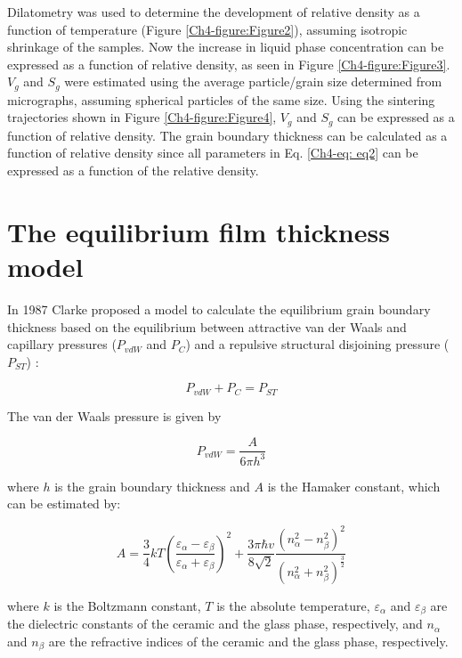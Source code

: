 Dilatometry was used to determine the development of relative density as a function of temperature (Figure \ref{Ch4-figure:Figure2}), assuming isotropic shrinkage of the samples. Now the increase in liquid phase concentration can be expressed as a function of relative density, as seen in Figure \ref{Ch4-figure:Figure3}. $V_{g}$ and $S_{g}$ were estimated using the average particle/grain size determined from micrographs, assuming spherical particles of the same size. Using the sintering trajectories shown in Figure \ref{Ch4-figure:Figure4}, $V_{g}$ and $S_{g}$ can be expressed as a function of relative density. The grain boundary thickness can be calculated as a function of relative density since all parameters in Eq. \ref{Ch4-eq: eq2} can be expressed as a function of the relative density.

\section{The equilibrium film thickness model}
In 1987 Clarke proposed a model to calculate the equilibrium grain boundary thickness based on the equilibrium between attractive van der Waals and capillary pressures ($P_{vdW}$ and $P_{C}$) and a repulsive structural disjoining pressure ($P_{ST}$) \cite{Clarke1987}:

\begin{equation}
\label{Ch4-eq: eq3}
P_{vdW} + P_{C} = P_{ST} 
\end{equation}

\noindent The van der Waals pressure is given by

\begin{equation}
\label{Ch4-eq: eq4}
P_{vdW} = \frac{A}{6 \pi h^{3}}
\end{equation}

\noindent where $h$ is the grain boundary thickness and $A$ is the Hamaker constant, which can be estimated by:

\begin{equation}
\label{Ch4-eq: eq5}
A = \frac{3}{4}kT\left( \frac{\varepsilon_{\alpha} - \varepsilon_{\beta}}{\varepsilon_{\alpha} + \varepsilon_{\beta}} \right)^{2} + \frac{3 \pi \hbar v}{8 \sqrt{2}} \frac{\left( n_{\alpha}^{2} - n_{\beta}^{2} \right)^{2}}{\left( n_{\alpha}^{2} + n_{\beta}^{2} \right)^{\frac{3}{2}}}
\end{equation}

\noindent where $k$ is the Boltzmann constant, $T$ is the absolute temperature, $\varepsilon_{\alpha}$ and $\varepsilon_{\beta}$ are the dielectric constants of the ceramic and the glass phase, respectively, and $n_{\alpha}$ and $n_{\beta}$ are the refractive indices of the ceramic and the glass phase, respectively.

